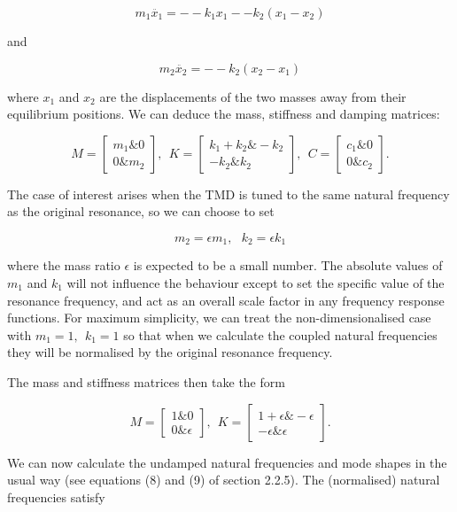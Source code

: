   $$m_1 \ddot{x_1} = -- k_1 x_1 -- k_2 (x_1 -x_2) \tag{1}$$ 

  and 

  $$m_2 \ddot{x_2} = -- k_2 (x_2 -x_1) \tag{2}$$ 

  where $x_1$ and $x_2$ are the displacements of the two masses away from their 
  equilibrium positions. We can deduce the mass, stiffness and damping 
  matrices: 

  $$M=\begin{bmatrix}m_1 \& 0\\ 0 \& 
  m_2\end{bmatrix},~~K=\begin{bmatrix}k_1+k_2 \& -k_2\\ -k_2 \& 
  k_2\end{bmatrix},~~C=\begin{bmatrix}c_1 \& 0\\ 0 \& c_2\end{bmatrix} . 
  \tag{3}$$ 

  The case of interest arises when the TMD is tuned to the same natural 
  frequency as the original resonance, so we can choose to set 

  $$m_2=\epsilon m_1,~~~k_2=\epsilon k_1 \tag{4}$$ 

  where the mass ratio $\epsilon$ is expected to be a small number. The 
  absolute values of $m_1$ and $k_1$ will not influence the behaviour except to 
  set the specific value of the resonance frequency, and act as an overall 
  scale factor in any frequency response functions. For maximum simplicity, we 
  can treat the non-dimensionalised case with $m_1=1,~~k_1=1$ so that when we 
  calculate the coupled natural frequencies they will be normalised by the 
  original resonance frequency. 

  The mass and stiffness matrices then take the form 

  $$M=\begin{bmatrix}1 \& 0\\ 0 \& 
  \epsilon\end{bmatrix},~~K=\begin{bmatrix}1+\epsilon \& -\epsilon\\ -\epsilon 
  \& \epsilon\end{bmatrix} . \tag{5}$$ 

  We can now calculate the undamped natural frequencies and mode shapes in the 
  usual way (see equations (8) and (9) of section 2.2.5). The (normalised) 
  natural frequencies satisfy 

